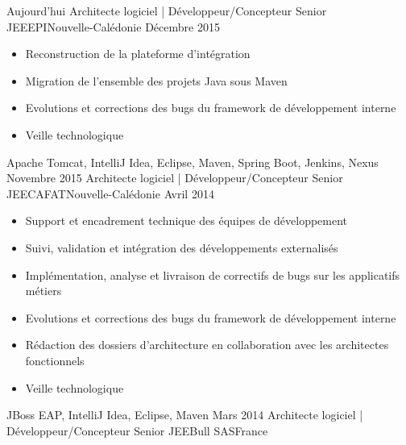\begin{experiences}
  \experience
    {Aujourd'hui}   {Architecte logiciel | Développeur/Concepteur Senior JEE}{EPI}{Nouvelle-Calédonie}
    {Décembre 2015} {
                      \begin{itemize}
                        \item Reconstruction de la plateforme d'intégration                        
                        \item Migration de l'ensemble des projets Java sous Maven                    
                        \item Evolutions et corrections des bugs du framework de développement interne                
                        \item Veille technologique                                                                    
                      \end{itemize}
                    }
                    {Apache Tomcat, IntelliJ Idea, Eclipse, Maven, Spring Boot, Jenkins, Nexus}
  \emptySeparator
  \experience
    {Novembre 2015} {Architecte logiciel | Développeur/Concepteur Senior JEE}{CAFAT}{Nouvelle-Calédonie}
    {Avril 2014}    {
                      \begin{itemize}
                        \item Support et encadrement technique des équipes de développement                           
                        \item Suivi, validation et intégration des développements externalisés                        
                        \item Implémentation, analyse et livraison de correctifs de bugs sur les applicatifs métiers  
                        \item Evolutions et corrections des bugs du framework de développement interne                
                        \item Rédaction des dossiers d'architecture en collaboration avec les architectes fonctionnels
                        \item Veille technologique                                                                    
                      \end{itemize}
                    }
                    {JBoss EAP, IntelliJ Idea, Eclipse, Maven}
  \emptySeparator
  \experience
    {Mars 2014}     {Architecte logiciel | Développeur/Concepteur Senior JEE}{Bull SAS}{France}

\end{experiences}
